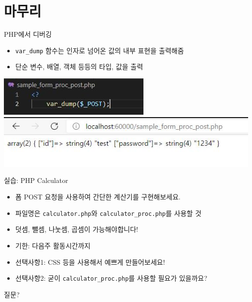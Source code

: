 \documentclass{beamer}
\begin{document}
\section{마무리}
    \begin{frame}{PHP에서 디버깅}
        \begin{itemize}
            \item \texttt{var\_dump} 함수는 인자로 넘어온 값의 내부 표현을 출력해줌
            \item 단순 변수, 배열, 객체 등등의 타입, 값을 출력
        \end{itemize}
        \vspace{0.4cm}
        \includegraphics{Images/sample_form_post_source.JPG}
        \includegraphics[width=\linewidth]{Images/login_form_post_result.JPG}
    \end{frame}
    \begin{frame}{실습: PHP Calculator}
        \begin{itemize}
            \item 폼 POST 요청을 사용하여 간단한 계산기를 구현해보세요.
            \item 파일명은 \texttt{calculator.php}와 \texttt{calculator\_proc.php}를 사용할 것
            \item 덧셈, 뺄셈, 나눗셈, 곱셈이 가능해야합니다!
            \item 기한: 다음주 활동시간까지
            \item 선택사항1: CSS 등을 사용해서 예쁘게 만들어보세요!
            \item 선택사항2: 굳이 \texttt{calculator\_proc.php}를 사용할 필요가 있을까요?
        \end{itemize}
    \end{frame}


    \begin{frame}{질문?}

    \end{frame}
\end{document}
